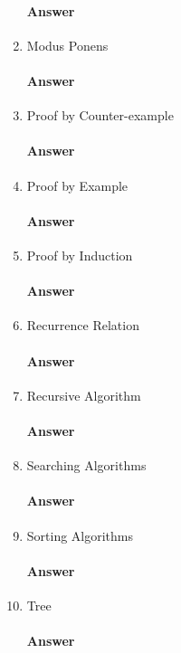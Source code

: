 \documentclass{article}
\begin{document}
\begin{enumerate}
        \paragraph{Answer}
    \item Modus Ponens
        \paragraph{Answer}
    \item Proof by Counter-example
        \paragraph{Answer}
    \item Proof by Example
        \paragraph{Answer}
    \item Proof by Induction
        \paragraph{Answer}
    \item Recurrence Relation
        \paragraph{Answer}
    \item Recursive Algorithm
        \paragraph{Answer}
    \item Searching Algorithms
        \paragraph{Answer}
    \item Sorting Algorithms
        \paragraph{Answer}
    \item Tree
        \paragraph{Answer}
\end{enumerate}
\end{document}

